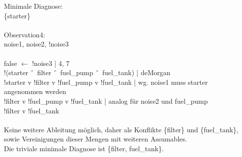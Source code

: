\documentclass[DIV=12,numbers=noenddot]{scrartcl}
\begin{document}
	Minimale Diagnose:\\
	\{starter\}\\\\
	Observation4:\\
	noise1, noise2, !noise3\\\\
	false $\leftarrow$ !noise3	| 4, 7\\
	!(starter \^\ \ filter \^\ \ fuel\_pump \^\ \ fuel\_tank) | deMorgan\\
	!starter v !filter v !fuel\_pump v !fuel\_tank | wg. noise1 muss starter angenommen werden\\
	!filter v !fuel\_pump v !fuel\_tank | analog für noise2 und fuel\_pump\\
	!filter v !fuel\_tank\\\\
	Keine weitere Ableitung möglich, daher als Konflikte \{filter\} und \{fuel\_tank\}, sowie Vereinigungen dieser Mengen mit weiteren Assumables.\\
	Die triviale minimale Diagnose ist \{filter, fuel\_tank\}.
	
	\newpage	
\end{document}
